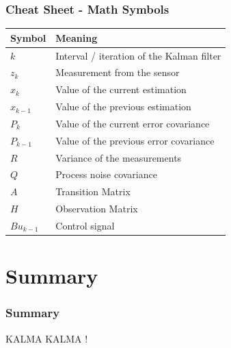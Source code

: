 \documentclass{beamer}
\begin{document}
\begin{frame}
    \frametitle{Cheat Sheet - Math Symbols}
    \begin{table}[h]
        \centering
        \begin{tabular}{|l|p{8cm}|}
            \hline
            \textbf{Symbol} & \textbf{Meaning}                          \\ \hline
            \(k\)           & Interval / iteration of the Kalman filter \\ \hline
            \(z_k\)         & Measurement from the sensor               \\ \hline
            \(x_k\)         & Value of the current estimation           \\ \hline
            \(x_{k-1}\)     & Value of the previous estimation          \\ \hline
            \(P_k\)         & Value of the current error covariance     \\ \hline
            \(P_{k-1}\)     & Value of the previous error covariance    \\ \hline
            \(R\)           & Variance of the measurements              \\ \hline
            \(Q\)           & Process noise covariance                  \\ \hline
            \(A\)           & Transition Matrix                         \\ \hline
            \(H\)           & Observation Matrix                        \\ \hline
            \(Bu_{k-1}\)    & Control signal                            \\ \hline
        \end{tabular}
    \end{table}
\end{frame}

\section{Summary}

\begin{frame}
    \frametitle{Summary}
    KALMA KALMA !
\end{frame}
\end{document}
